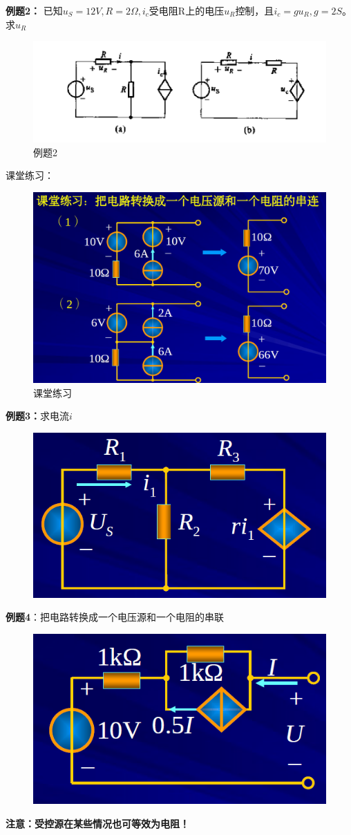 \documentclass[11pt,a4paper,oneside]{book}
\begin{document}
\noindent \textbf{例题2：}
已知$u_S=12V,R=2\Omega,i_c$受电阻R上的电压$u_R$控制，且$i_c=gu_R,g=2S$。求$u_R$
\begin{figure}[H]
	\centering
	\includegraphics[width=0.5\linewidth]{screenshot019}
	\caption{例题2}
	\label{fig:screenshot019}
\end{figure}
课堂练习：
\begin{figure}[H]
	\centering
	\includegraphics[width=0.5\linewidth]{screenshot023}
	\caption{课堂练习}
	\label{fig:screenshot023}
\end{figure}
\newpage
\noindent\textbf{例题3：}求电流$i$
\begin{figure}[H]
	\centering
	\includegraphics[width=0.5\linewidth]{screenshot024}
	\caption{}
	\label{fig:screenshot024}
\end{figure}
\noindent\textbf{例题4}：把电路转换成一个电压源和一个电阻的串联
\begin{figure}[H]
	\centering
	\includegraphics[width=0.5\linewidth]{screenshot025}
	\caption{}
	\label{fig:screenshot025}
\end{figure}
\textbf{注意：受控源在某些情况也可等效为电阻！}
\end{document}
